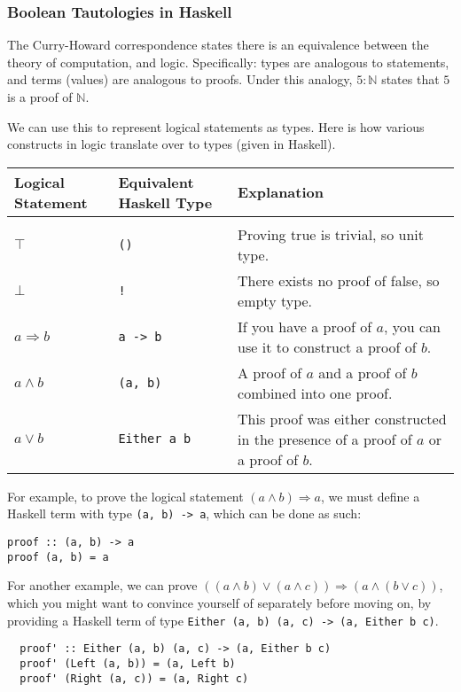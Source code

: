 \documentclass[12pt,twoside]{report}
\begin{document}
\subsubsection{Boolean Tautologies in Haskell}
The Curry-Howard correspondence states there is an equivalence between the theory of computation, and logic. Specifically: types are analogous to statements, and terms (values) are analogous to proofs. Under this analogy, $5 : \mathbb{N}$ states that $5$ is a proof of $\mathbb{N}$.

We can use this to represent logical statements as types. Here is how various constructs in logic translate over to types (given in Haskell).

\begin{tabularx}{\textwidth}{ X|X|X }
  Logical Statement & Equivalent Haskell Type & Explanation \\
  \hline \\
  $\top$ & \verb|()| & Proving true is trivial, so unit type. \\
  $\bot$ & \verb|!| & There exists no proof of false, so empty type. \\
  $a \Rightarrow b$ & \verb|a -> b| & If you have a proof of $a$, you can use it to construct a proof of $b$. \\
  $a \wedge b$ & \verb|(a, b)| & A proof of $a$ and a proof of $b$ combined into one proof. \\
  $a \vee b$ & \verb|Either a b| & This proof was either constructed in the presence of a proof of $a$ or a proof of $b$.
\end{tabularx}

For example, to prove the logical statement $(a \wedge b) \Rightarrow a$, we must define a Haskell term with type \verb|(a, b) -> a|, which can be done as such:

\begin{verbatim}
proof :: (a, b) -> a
proof (a, b) = a
\end{verbatim}

For another example, we can prove $((a \wedge b) \vee (a \wedge c)) \Rightarrow (a \wedge (b \vee c))$, which you might want to convince yourself of separately before moving on, by providing a Haskell term of type \verb|Either (a, b) (a, c) -> (a, Either b c)|.

\begin{verbatim}
  proof' :: Either (a, b) (a, c) -> (a, Either b c)
  proof' (Left (a, b)) = (a, Left b)
  proof' (Right (a, c)) = (a, Right c)
\end{verbatim}
\end{document}
